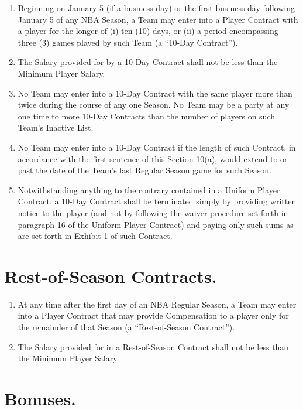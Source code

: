 \documentclass[
]{book}
\providecommand{\tightlist}{%
  \setlength{\itemsep}{0pt}\setlength{\parskip}{0pt}}
\begin{document}
\begin{enumerate}
\def\labelenumi{(\alph{enumi})}
\tightlist
\item
  Beginning on January 5 (if a business day) or the first business day following January 5 of any NBA Season, a Team may enter into a Player Contract with a player for the longer of (i) ten (10) days, or (ii) a period encompassing three (3) games played by such Team (a ``10-Day Contract'').
\item
  The Salary provided for by a 10-Day Contract shall not be less than the Minimum Player Salary.
\item
  No Team may enter into a 10-Day Contract with the same player more than twice during the course of any one Season. No Team may be a party at any one time to more 10-Day Contracts than the number of players on such Team's Inactive List.
\item
  No Team may enter into a 10-Day Contract if the length of such Contract, in accordance with the first sentence of this Section 10(a), would extend to or past the date of the Team's last Regular Season game for such Season.
\item
  Notwithstanding anything to the contrary contained in a Uniform Player Contract, a 10-Day Contract shall be terminated simply by providing written notice to the player (and not by following the waiver procedure set forth in paragraph 16 of the Uniform Player Contract) and paying only such sums as are set forth in Exhibit 1 of such Contract.
\end{enumerate}

\hypertarget{rest-of-season-contracts.}{%
\section{Rest-of-Season Contracts.}\label{rest-of-season-contracts.}}

\begin{enumerate}
\def\labelenumi{(\alph{enumi})}
\tightlist
\item
  At any time after the first day of an NBA Regular Season, a Team may enter into a Player Contract that may provide Compensation to a player only for the remainder of that Season (a ``Rest-of-Season Contract'').
\item
  The Salary provided for in a Rest-of-Season Contract shall not be less than the Minimum Player Salary.
\end{enumerate}

\hypertarget{bonuses.}{%
\section{Bonuses.}\label{bonuses.}}
\end{document}

